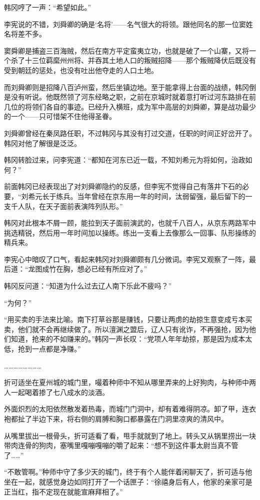 韩冈哼了一声：“希望如此。”

李宪说的不错，刘舜卿的确是‘名将’——名气很大的将领。跟他同名的那一位窦姓名将差不多。

窦舜卿是捕盗三百海贼，然后在南方平定蛮夷立功，也就是破了一个山寨，又将一个杀了十三位羁縻州州将、并吞其土地人口的叛贼招降——那个叛贼降伏后既没有受到朝廷的惩处，也没有吐出他夺走的人口土地。

而刘舜卿则是招降八百泸州蛮，然后坐镇边地。至于能拿得上台面的战绩，韩冈倒是没有听说。他既然领了河东经略之职，之前在京城时就着意打听过河东路排在前几位的将领们各自的事迹。已经升入横班，成为军中高层的刘舜卿，算是战功最少的一个——只可惜架不住他得圣眷。

刘舜卿曾经在秦凤路任职，不过韩冈与其没有打过交道，任职的时间正好岔开了。韩冈对他了解很是泛泛。

韩冈转脸过来，问李宪道：“都知在河东已近一载，不知刘希元为将如何，治政如何？”

前面韩冈已经表现出了对刘舜卿隐约的反感，但李宪不觉得自己有落井下石的必要，“刘希元长于练兵。当年曾经在京东用一年的时间，汰弱留强，最后留下的一支千人队，在天子面前表演阵列队形。”

韩冈对此根本不屑一顾，能拉到天子面前演武的，也就千八百人，从京东两路军中挑选精锐，然后用一年时间加以操练。练出一支看上去像那么一回事、队形操练的精兵来。

李宪心中暗叹了口气，看起来韩冈对刘舜卿颇有几分微词。李宪又观察了一阵，最后道：“龙图成竹在胸，想必已经有所应对了。”

韩冈反问道：“知道为什么过去辽人南下乐此不疲吗？”

“为何？”

“用买卖的手法来比喻。南下打草谷那是赚钱，只要让两虏的劫掠生意变成亏本买卖，他们就不会再继续做了。所以澶渊之盟后，辽人只有讹诈，不再强抢，因为他们知道，抢来的不如赚来的。”韩冈一声长叹：“党项人年年劫掠，那是因为成本太低，抢到一点都是净赚。”

……………………

折可适坐在夏州城的城门里，嘬着种师中不知从哪里弄来的上好狗肉，与种师中两人一起喝着掺了七八成水的淡酒。

外面炽烈的太阳依然散发着热毒，而城门门洞中，却有着难得阴凉。卸了甲，连衣袍都扯了半边下来，将右侧的肩膊和胸口都暴露在门洞里凉爽的清风中。

从嘴里拔出一根骨头，折可适看了看，甩手就就到了地上。转头又从锅里捞出一块带肉连骨的狗肉，塞嘴里嘎嘣嘎嘣的嚼了起来：“想不到这件事太尉当真不管了……”

“不敢管啊。”种师中守了多少天的城门，终于有个人能伴着闲聊天了，折可适与他坐在一起，就感觉身边如同打开了一个话匣子：“徐禧身后有人，他家的亲家可是正当红，指不定现在就能宣麻拜相了。”

